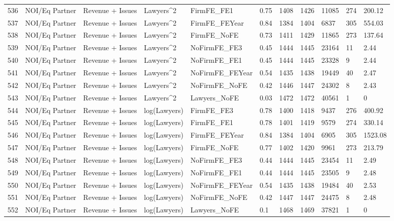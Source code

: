 \begin{table}[ht]
\begin{tabular}{rllllllllll}
  536 & NOI/Eq Partner & Revenue + Issues & Lawyers^2 & FirmFE\_FE1 & 0.75 & 1408 & 1426 & 11085 & 274 & 200.12 \\ 
  537 & NOI/Eq Partner & Revenue + Issues & Lawyers^2 & FirmFE\_FEYear & 0.84 & 1384 & 1404 & 6837 & 305 & 554.03 \\ 
  538 & NOI/Eq Partner & Revenue + Issues & Lawyers^2 & FirmFE\_NoFE & 0.73 & 1411 & 1429 & 11865 & 273 & 137.64 \\ 
  539 & NOI/Eq Partner & Revenue + Issues & Lawyers^2 & NoFirmFE\_FE3 & 0.45 & 1444 & 1445 & 23164 & 11 & 2.44 \\ 
  540 & NOI/Eq Partner & Revenue + Issues & Lawyers^2 & NoFirmFE\_FE1 & 0.45 & 1444 & 1445 & 23328 & 9 & 2.44 \\ 
  541 & NOI/Eq Partner & Revenue + Issues & Lawyers^2 & NoFirmFE\_FEYear & 0.54 & 1435 & 1438 & 19449 & 40 & 2.47 \\ 
  542 & NOI/Eq Partner & Revenue + Issues & Lawyers^2 & NoFirmFE\_NoFE & 0.42 & 1446 & 1447 & 24302 & 8 & 2.43 \\ 
  543 & NOI/Eq Partner & Revenue + Issues & Lawyers^2 & Lawyers\_NoFE & 0.03 & 1472 & 1472 & 40561 & 1 & 0 \\ 
  544 & NOI/Eq Partner & Revenue + Issues & log(Lawyers) & FirmFE\_FE3 & 0.78 & 1400 & 1418 & 9437 & 276 & 400.92 \\ 
  545 & NOI/Eq Partner & Revenue + Issues & log(Lawyers) & FirmFE\_FE1 & 0.78 & 1401 & 1419 & 9579 & 274 & 330.14 \\ 
  546 & NOI/Eq Partner & Revenue + Issues & log(Lawyers) & FirmFE\_FEYear & 0.84 & 1384 & 1404 & 6905 & 305 & 1523.08 \\ 
  547 & NOI/Eq Partner & Revenue + Issues & log(Lawyers) & FirmFE\_NoFE & 0.77 & 1402 & 1420 & 9961 & 273 & 213.79 \\ 
  548 & NOI/Eq Partner & Revenue + Issues & log(Lawyers) & NoFirmFE\_FE3 & 0.44 & 1444 & 1445 & 23454 & 11 & 2.49 \\ 
  549 & NOI/Eq Partner & Revenue + Issues & log(Lawyers) & NoFirmFE\_FE1 & 0.44 & 1444 & 1445 & 23505 & 9 & 2.48 \\ 
  550 & NOI/Eq Partner & Revenue + Issues & log(Lawyers) & NoFirmFE\_FEYear & 0.54 & 1435 & 1438 & 19484 & 40 & 2.53 \\ 
  551 & NOI/Eq Partner & Revenue + Issues & log(Lawyers) & NoFirmFE\_NoFE & 0.42 & 1447 & 1447 & 24475 & 8 & 2.48 \\ 
  552 & NOI/Eq Partner & Revenue + Issues & log(Lawyers) & Lawyers\_NoFE & 0.1 & 1468 & 1469 & 37821 & 1 & 0 \\ 

\end{tabular}
\end{table}
